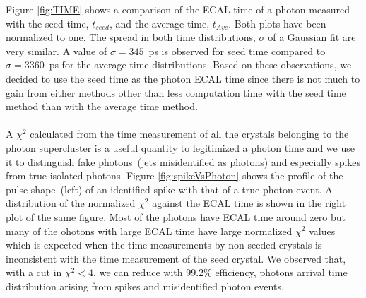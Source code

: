 Figure \ref{fig:TIME} shows a comparison of the ECAL time of a photon measured with the seed time, $t_{seed}$, and the average time, $t_{Ave}$. Both plots have been normalized to one.
\newline
The spread in both time distributions, $\sigma$ of a Gaussian fit are very similar. A value of  $\sigma = 345$~ps is observed for seed time compared to $\sigma = 3360$~ps for the average time distributions.  Based on these observations, we decided to use  the seed time as the photon ECAL time since there is not much to gain from either methods other than less computation time with the seed time method than with the average time method. 
\paragraph*{}
  A $\chi^{2}$ calculated from the time measurement of all the crystals belonging to the photon supercluster is a useful quantity to legitimized a photon time and we use it to distinguish fake photons~(jets misidentified as photons) and especially spikes from true isolated photons. Figure  \ref{fig:spikeVsPhoton} shows the profile of the pulse shape~(left) of an identified spike with that of a true photon event. A distribution of the normalized $\chi^{2}$ against the ECAL time is shown in the right plot of the same figure. Most of the photons have ECAL time around zero but many of the ohotons with large ECAL time  have large normalized $\chi^{2}$ values which is expected when the time measurements by non-seeded crystals is inconsistent with the time measurement of the seed crystal. We observed that, with a cut in $\chi^{2} < 4$, we can reduce with 99.2\% efficiency, photons arrival time distribution arising from spikes and misidentified photon events.

